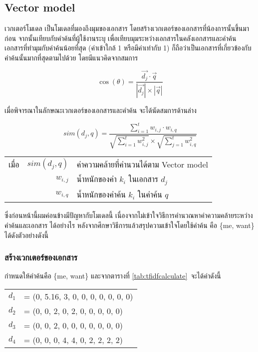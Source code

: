 \documentclass[11pt,a4paper]{article}
\begin{document}
{{{\newpage

\subsection{Vector model}

เวกเตอร์โมเดล เป็นโมเดลที่มองถึงมุมของเอกสาร โดยสร้างเวกเตอร์ของเอกสารที่น้องการนั้นขึ้นมาก่อน จากนั้นเทียบกับคำค้นที่ผู้ใช้งานระบุ
เพื่อเทียบมุมระหว่างเอกสารในคลังเอกสารและคำค้น เอกสารที่ทำมุมกับคำค้นน้อยที่สุด (ค่าเข้าใกล้ 1 หรือมีค่าเท่ากับ 1) 
ก็ถือว่าเป็นเอกสารที่เกี่ยวข้องกับคำค้นนั้นมากที่สุดตามไปด้วย โดยมีแนวคิดจากสมการ

\begin{equation*}
    \cos{(\theta)} = \frac{\overrightarrow{d_j} \cdot {\overrightarrow{q}}}{|\overrightarrow{d_j}| \times |\overrightarrow{q}|}
    \label{eq:coseq}
\end{equation*}

เมื่อพิจารณาในลักษณะเวกเตอร์ของเอกสารและคำค้น จะได้นัดสมการด้านล่าง

\begin{equation}
    sim(d_{j},q) = \frac{\sum_{i=1}^{t}{w_{i,j} \cdot w_{i,q}}}{\sqrt{\sum_{i=1}^{t}{w^2_{i,j}}} \times \sqrt{\sum_{j=1}^{t}{w^2_{i,q}}}}
\end{equation}

\begin{table}[ht!]
    \begin{tabular}{lrl}
        เมื่อ & $sim(d_{j}, q)$   & ค่าความคล้ายที่คำนวนได้ตาม Vector model \\
            & $w_{i,j}$         & น้ำหนักของคำ $k_i$ ในเอกสาร $d_j$ \\
            & $w_{i,q}$         & น้ำหนักของคำค้น $k_i$ ในคำค้น $q$ 
    \end{tabular}
\end{table}

ซึ่งก่อนหน้านี้ผมค่อนข้างมีปัญหากับโมเดลนี้ เนื่องจากไม่เข้าใจวิธีการคำนวณหาค่าความคล้ายระหว่างคำค้นและเอกสาร ได้อย่างไร หลังจากศึกษาวิธีการแล้วสรุปความเข้าใจโดยใช้คำค้น 
คือ \{me, want\} ได้ดังตัวอย่างดังนี้

\subsubsection{สร้างเวกเตอร์ของเอกสาร}

กำหนดให้คำค้นคือ \{me, want\} และจากตารางที่ \ref{tab:tfidfcalculate}\ จะได้ค่าดังนี้

\begin{table}[ht!]
    \centering
    \begin{tabular}{cl} 
        $d_1$   & = (0, 5.16, 3, 0, 0, 0, 0, 0, 0, 0)  \\
        $d_2$   & = (0,    0, 2, 0, 2, 0, 0, 0, 0, 0) \\
        $d_3$   & = (0,    0, 2, 0, 0, 0, 0, 0, 0, 0)  \\
        $d_4$   & = (0,    0, 0, 4, 4, 0, 2, 2, 2, 2)  \\
    \end{tabular}
    \label{tab:inputvector}
\end{table}

}}}
\end{document}

